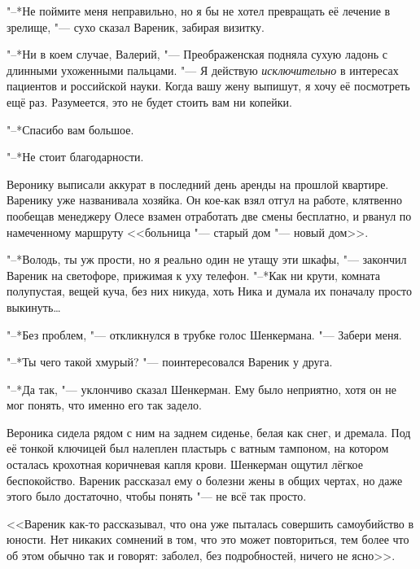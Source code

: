 "--*Не поймите меня неправильно, но я бы не хотел превращать её лечение в зрелище, "--- сухо сказал Вареник, забирая визитку.

"--*Ни в коем случае, Валерий, "--- Преображенская подняла сухую ладонь с длинными ухоженными пальцами.
"--- Я действую \emph{исключительно} в интересах пациентов и российской науки.
Когда вашу жену выпишут, я хочу её посмотреть ещё раз.
Разумеется, это не будет стоить вам ни копейки.

"--*Спасибо вам большое.

"--*Не стоит благодарности.

\textspace

\asterism

\label{Wed_2012_06_20}

Веронику выписали аккурат в последний день аренды на прошлой квартире.
Варенику уже названивала хозяйка.
Он кое-как взял отгул на работе, клятвенно пообещав менеджеру Олесе взамен отработать две смены бесплатно, и рванул по намеченному маршруту <<больница "--- старый дом "--- новый дом>>.

"--*Володь, ты уж прости, но я реально один не утащу эти шкафы, "--- закончил Вареник на светофоре, прижимая к уху телефон.
"--*Как ни крути, комната полупустая, вещей куча, без них никуда, хоть Ника и думала их поначалу просто выкинуть\dots{}

"--*Без проблем, "--- откликнулся в трубке голос Шенкермана.
"--- Забери меня.

"--*Ты чего такой хмурый? "--- поинтересовался Вареник у друга.

"--*Да так, "--- уклончиво сказал Шенкерман.
Ему было неприятно, хотя он не мог понять, что именно его так задело.

Вероника сидела рядом с ним на заднем сиденье, белая как снег, и дремала.
Под её тонкой ключицей был налеплен пластырь с ватным тампоном, на котором осталась крохотная коричневая капля крови.
Шенкерман ощутил лёгкое беспокойство.
Вареник рассказал ему о болезни жены в общих чертах, но даже этого было достаточно, чтобы понять "--- не всё так просто.

<<Вареник как-то рассказывал, что она уже пыталась совершить самоубийство в юности.
Нет никаких сомнений в том, что это может повториться, тем более что об этом обычно так и говорят: заболел, без подробностей, ничего не ясно>>.

